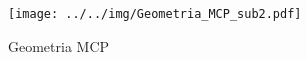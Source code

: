\begin{subfigure}[h]{\textwidth/\relax}\centering\texttt{[image: ../../img/Geometria\_MCP\_sub2.pdf]}\caption{Geometria MCP}\label{fig:Geometria_MCP}\end{subfigure}%
